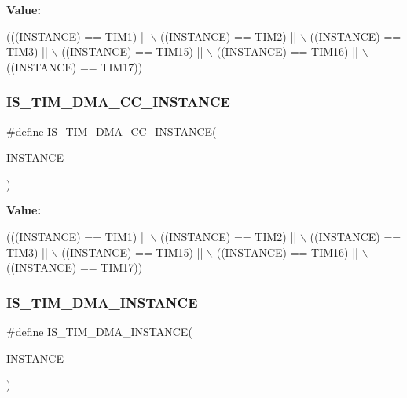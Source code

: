 {\bfseries Value\+:}
\begin{DoxyCode}
(((INSTANCE) == TIM1)    || \(\backslash\)
   ((INSTANCE) == TIM2)    || \(\backslash\)
   ((INSTANCE) == TIM3)    || \(\backslash\)
   ((INSTANCE) == TIM15)   || \(\backslash\)
   ((INSTANCE) == TIM16)   || \(\backslash\)
   ((INSTANCE) == TIM17))
\end{DoxyCode}
\mbox{\label{group___exported__macro_gad80a186286ce3daa92249a8d52111aaf}} 
\subsubsection{\texorpdfstring{I\+S\+\_\+\+T\+I\+M\+\_\+\+D\+M\+A\+\_\+\+C\+C\+\_\+\+I\+N\+S\+T\+A\+N\+CE}{IS\_TIM\_DMA\_CC\_INSTANCE}\hspace{0.1cm}{\footnotesize\ttfamily [16/16]}}
{\footnotesize\ttfamily \#define I\+S\+\_\+\+T\+I\+M\+\_\+\+D\+M\+A\+\_\+\+C\+C\+\_\+\+I\+N\+S\+T\+A\+N\+CE(\begin{DoxyParamCaption}\item[{}]{I\+N\+S\+T\+A\+N\+CE }\end{DoxyParamCaption})}

{\bfseries Value\+:}
\begin{DoxyCode}
(((INSTANCE) == TIM1)    || \(\backslash\)
   ((INSTANCE) == TIM2)    || \(\backslash\)
   ((INSTANCE) == TIM3)    || \(\backslash\)
   ((INSTANCE) == TIM15)   || \(\backslash\)
   ((INSTANCE) == TIM16)   || \(\backslash\)
   ((INSTANCE) == TIM17))
\end{DoxyCode}
\mbox{\label{group___exported__macro_gad51d77b3bcc12a3a5c308d727b561371}} 
\subsubsection{\texorpdfstring{I\+S\+\_\+\+T\+I\+M\+\_\+\+D\+M\+A\+\_\+\+I\+N\+S\+T\+A\+N\+CE}{IS\_TIM\_DMA\_INSTANCE}\hspace{0.1cm}{\footnotesize\ttfamily [1/16]}}
{\footnotesize\ttfamily \#define I\+S\+\_\+\+T\+I\+M\+\_\+\+D\+M\+A\+\_\+\+I\+N\+S\+T\+A\+N\+CE(\begin{DoxyParamCaption}\item[{}]{I\+N\+S\+T\+A\+N\+CE }\end{DoxyParamCaption})}

